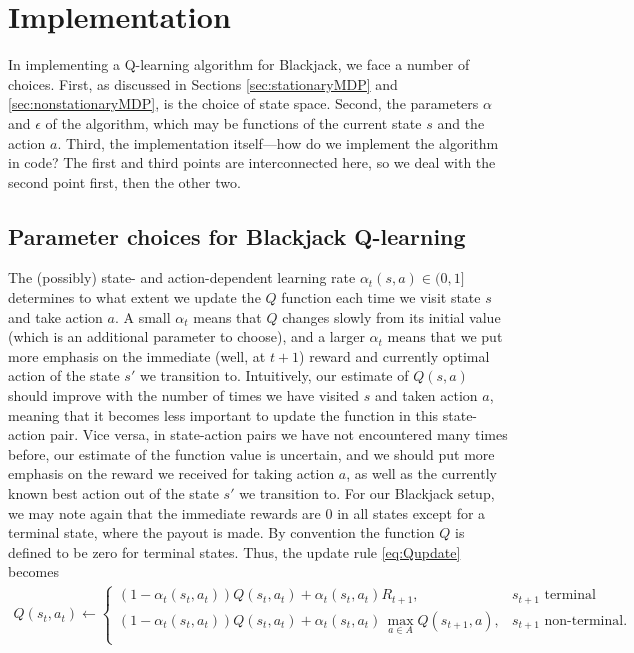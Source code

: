 \section{Implementation} \label{sec:implementation}
In implementing a Q-learning algorithm for Blackjack, we face a number of choices.
First, as discussed in Sections \ref{sec:stationaryMDP} and \ref{sec:nonstationaryMDP}, is the choice of state space.
Second, the parameters $\alpha$ and $\epsilon$ of the algorithm, which may be functions of the current state $s$ and
the action $a$. Third, the implementation itself---how do we implement the algorithm in code? The first and third points
are interconnected here, so we deal with the second point first, then the other two.

\subsection{Parameter choices for Blackjack Q-learning} \label{sec:paramchoices}
The (possibly) state- and action-dependent learning rate $\alpha_t(s, a) \in (0, 1]$ determines to what extent we update 
the $Q$ function each time we visit state $s$ and take action $a$. A small $\alpha_t$ means that $Q$ changes slowly
from its initial value (which is an additional parameter to choose), and a larger $\alpha_t$ means that we put more
emphasis on the immediate (well, at $t+1$) reward and currently optimal action of the state $s'$ we transition to.
%
Intuitively, our estimate of $Q(s,a)$ should improve with the number of times we have visited $s$ and taken action $a$,
meaning that it becomes less important to update the function in this state-action pair. Vice versa, in state-action pairs
we have not encountered many times before, our estimate of the function value is uncertain, and we should put more emphasis
on the reward we received for taking action $a$, as well as the currently known best action out of the state $s'$ we transition to.
For our Blackjack setup, we may note again that the immediate rewards are 0 in all states except for a terminal state, where the payout is made. By convention the function $Q$ is defined to be zero for terminal states. Thus, the update rule \ref{eq:Qupdate} becomes
\begin{align} \label{eq:bjQupdate}
          Q(s_t,a_t)  \leftarrow 
          \begin{cases}
            (1-\alpha_t(s_t,a_t))Q(s_t,a_t) + \alpha_t(s_t,a_t) R_{t+1}, &s_{t+1} \text{ terminal} \\
            (1-\alpha_t(s_t,a_t))Q(s_t,a_t) + \alpha_t(s_t,a_t) \, \underset{a \in A}{\max} Q(s_{t+1},a), &s_{t+1} \text{ non-terminal}. \\
          \end{cases}
\end{align}

